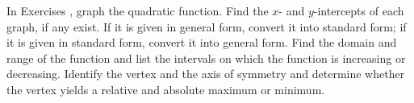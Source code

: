 {\noindent In Exercises}
{, graph the quadratic function.  Find the $x$- and $y$-intercepts of each graph, if any exist.  If it is given in general form, convert it into standard form; if it is given in standard form, convert it into general form.  Find the domain and range of the function and list the intervals on which the function is increasing or decreasing.  Identify the vertex and the axis of symmetry and determine whether the vertex yields a relative and absolute maximum or minimum.}
